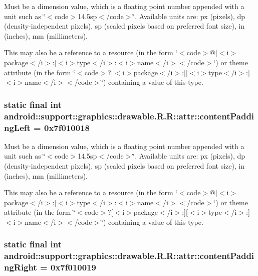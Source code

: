 Must be a dimension value, which is a floating point number appended with a unit such as \char`\"{}$<$code$>$14.5sp$<$/code$>$\char`\"{}. Available units are: px (pixels), dp (density-independent pixels), sp (scaled pixels based on preferred font size), in (inches), mm (millimeters). 

This may also be a reference to a resource (in the form \char`\"{}$<$code$>$@\mbox{[}$<$i$>$package$<$/i$>$:\mbox{]}$<$i$>$type$<$/i$>$:$<$i$>$name$<$/i$>$$<$/code$>$\char`\"{}) or theme attribute (in the form \char`\"{}$<$code$>$?\mbox{[}$<$i$>$package$<$/i$>$:\mbox{]}\mbox{[}$<$i$>$type$<$/i$>$:\mbox{]}$<$i$>$name$<$/i$>$$<$/code$>$\char`\"{}) containing a value of this type. \hypertarget{classandroid_1_1support_1_1graphics_1_1drawable_1_1_r_1_1attr_c332f2614660071cb5264a61a6738c27}{
\subsubsection[{contentPaddingLeft}]{\setlength{\rightskip}{0pt plus 5cm}static final int android::support::graphics::drawable.R.R::attr::contentPaddingLeft = 0x7f010018}}
\label{classandroid_1_1support_1_1graphics_1_1drawable_1_1_r_1_1attr_c332f2614660071cb5264a61a6738c27}


Must be a dimension value, which is a floating point number appended with a unit such as \char`\"{}$<$code$>$14.5sp$<$/code$>$\char`\"{}. Available units are: px (pixels), dp (density-independent pixels), sp (scaled pixels based on preferred font size), in (inches), mm (millimeters). 

This may also be a reference to a resource (in the form \char`\"{}$<$code$>$@\mbox{[}$<$i$>$package$<$/i$>$:\mbox{]}$<$i$>$type$<$/i$>$:$<$i$>$name$<$/i$>$$<$/code$>$\char`\"{}) or theme attribute (in the form \char`\"{}$<$code$>$?\mbox{[}$<$i$>$package$<$/i$>$:\mbox{]}\mbox{[}$<$i$>$type$<$/i$>$:\mbox{]}$<$i$>$name$<$/i$>$$<$/code$>$\char`\"{}) containing a value of this type. \hypertarget{classandroid_1_1support_1_1graphics_1_1drawable_1_1_r_1_1attr_1090ed7a3f302b698f79ffd356bf1aa6}{
\subsubsection[{contentPaddingRight}]{\setlength{\rightskip}{0pt plus 5cm}static final int android::support::graphics::drawable.R.R::attr::contentPaddingRight = 0x7f010019}}
\label{classandroid_1_1support_1_1graphics_1_1drawable_1_1_r_1_1attr_1090ed7a3f302b698f79ffd356bf1aa6}


